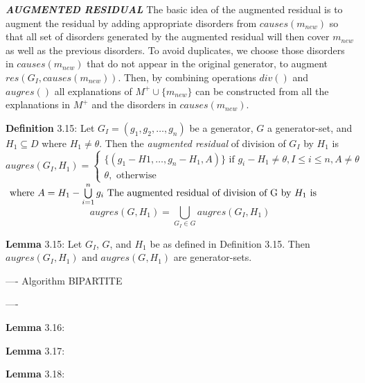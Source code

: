 \documentclass{article}
\begin{document}
\par
\textit{\textbf{AUGMENTED RESIDUAL}}
\newline
The basic idea of the augmented residual is to augment the residual by adding
appropriate disorders from $causes(m_{new})$ so that all set of disorders
generated by the augmented residual will then cover $m_{new}$ as well as the
previous disorders. To avoid duplicates, we choose those disorders in
$causes(m_{new})$ that do not appear in the original generator, to augment
$res(G_I, causes(m_{new}))$. Then, by combining operations $div()$ and
$augres()$ all explanations of $M^{+} \cup \{m_{new}\}$ can be constructed from
all the explanations in $M^{+}$ and the disorders in $causes(m_{new})$.
\newline
\par 
\textbf{Definition} 3.15: Let $G_I = ( g_1, g_2, \ldots, g_n)$ be a
generator, $G$ a generator-set, and $H_1 \subseteq D$ where $H_1 \neq \theta$.
Then the \textit{augmented residual} of division of $G_I$ by $H_1$ is
\[
augres(G_I, H_1) = 
\begin{cases}
 \{ (g_1 - H1, \ldots, g_n - H_1, A) \} \text{ if } g_i - H_1 \neq \theta, I
 \leq i \leq n, A \neq \theta
 \\
 \theta, \text{ otherwise}
\end{cases}
\]
\newline
$\text{ where } A = H_1 - \bigcup\limits_{i=1}^{n} g_i
\newline
\text{ The augmented residual of division of G by } H_1 \text{ is }$
\[
augres(G, H_1) = \bigcup\limits_{G_I \in G}augres(G_I, H_1)
\]
\newline

\par 
\textbf{Lemma} 3.15: Let $G_I$, $G$, and $H_1$ be as defined in Definition 3.15.
Then $augres( G_I, H_1) \text{ and } augres(G, H_1)$ are generator-sets.
\newline

----
\newline
Algorithm BIPARTITE
\newline



----

\par 
\textbf{Lemma} 3.16:
\newline

\par 
\textbf{Lemma} 3.17:
\newline

\par 
\textbf{Lemma} 3.18:
\newline
\end{document}
